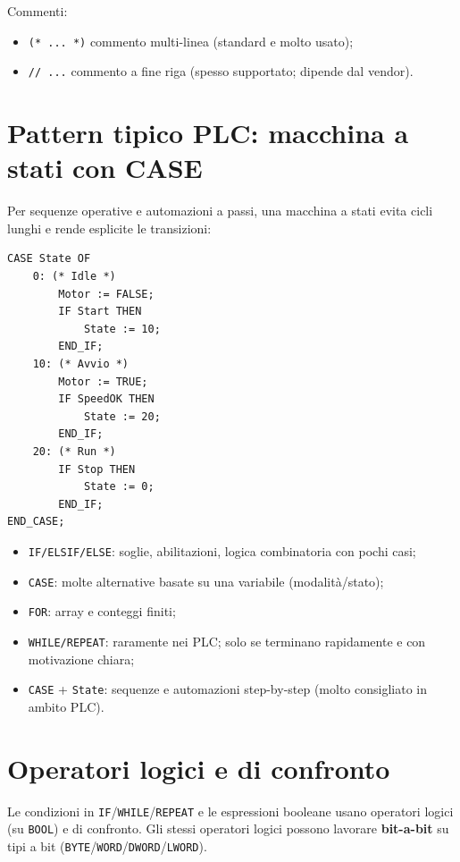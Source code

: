 Commenti:
\begin{itemize}
    \item \texttt{(* ... *)} commento multi-linea (standard e molto usato);
    \item \texttt{// ...} commento a fine riga (spesso supportato; dipende dal vendor).
\end{itemize}

\section{Pattern tipico PLC: macchina a stati con CASE}
Per sequenze operative e automazioni a passi, una macchina a stati evita cicli lunghi e rende esplicite le transizioni:
\begin{lstlisting}[basicstyle=\ttfamily\small]
CASE State OF
    0: (* Idle *)
        Motor := FALSE;
        IF Start THEN
            State := 10;
        END_IF;
    10: (* Avvio *)
        Motor := TRUE;
        IF SpeedOK THEN
            State := 20;
        END_IF;
    20: (* Run *)
        IF Stop THEN
            State := 0;
        END_IF;
END_CASE;
\end{lstlisting}

\begin{note}
\begin{itemize}
    \item \texttt{IF/ELSIF/ELSE}: soglie, abilitazioni, logica combinatoria con pochi casi;
    \item \texttt{CASE}: molte alternative basate su una variabile (modalità/stato);
    \item \texttt{FOR}: array e conteggi finiti;
    \item \texttt{WHILE/REPEAT}: raramente nei PLC; solo se terminano rapidamente e con motivazione chiara;
    \item \texttt{CASE} + \texttt{State}: sequenze e automazioni step-by-step (molto consigliato in ambito PLC).
\end{itemize}
\end{note}

\section{Operatori logici e di confronto}
Le condizioni in \texttt{IF}/\texttt{WHILE}/\texttt{REPEAT} e le espressioni booleane usano operatori logici (su \texttt{BOOL}) e di confronto. Gli stessi operatori logici possono lavorare \textbf{bit-a-bit} su tipi a bit (\texttt{BYTE}/\texttt{WORD}/\texttt{DWORD}/\texttt{LWORD}).

